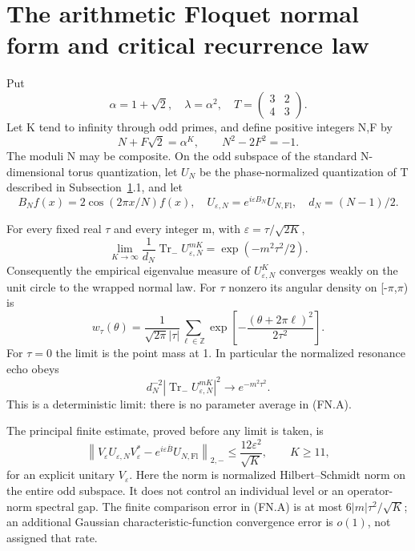 
\section{The arithmetic Floquet normal form and critical recurrence law}\label{sec:floquet}
Put \[
 \alpha=1+\sqrt2,\quad \lambda=\alpha^2,\quad
 T=\begin{pmatrix}3&2\\4&3\end{pmatrix}.
\] Let K tend to infinity through odd primes, and define positive integers N,F by \[
 N+F\sqrt2=\alpha^K,\qquad N^2-2F^2=-1.
\] The moduli N may be composite. On the odd subspace of the standard N-dimensional torus quantization, let \(U_{N}\) be the phase-normalized quantization of T described in Subsection~\ref{sec:floquet}.1, and let \[
 B_N f(x)=2\cos(2\pi x/N)f(x),\quad
 U_{\varepsilon,N}=e^{i\varepsilon B_N}U_{N,\mathrm{Fl}},\quad
 d_N=(N-1)/2.
\]

\begin{theorem}\label{pass1:ch07_floquet_resonance-1} For every fixed real \(\tau\) and every integer m, with \(\varepsilon=\tau/\sqrt{2K}\), \[
 \lim_{K\longrightarrow\infty}
 \frac{1}{d_N}\operatorname{Tr}_{-}
       U_{\varepsilon,N}^{mK}
       =\exp(-m^2\tau^2/2).                                      \tag{FN.A}
\] Consequently the empirical eigenvalue measure of \(U_{\varepsilon,N}^K\) converges weakly on the unit circle to the wrapped normal law. For \(\tau\) nonzero its angular density on {[}-\(\pi\),\(\pi\)) is \[
 w_\tau(\theta)=\frac{1}{\sqrt{2\pi}|\tau|}
       \sum_{\ell\in\mathbb Z}
       \exp\!\left[-\frac{(\theta+2\pi\ell)^2}{2\tau^2}\right].   \tag{FN.B}
\] For \(\tau=0\) the limit is the point mass at 1. In particular the normalized resonance echo obeys \[
 d_N^{-2}\left|\operatorname{Tr}_{-}U_{\varepsilon,N}^{mK}\right|^2
       \longrightarrow e^{-m^2\tau^2}.                          \tag{FN.C}
\] This is a deterministic limit: there is no parameter average in (FN.A).
\end{theorem}

The principal finite estimate, proved before any limit is taken, is \[
 \left\|V_\varepsilon U_{\varepsilon,N}V_\varepsilon^*
            -e^{i\varepsilon\overline B}U_{N,\mathrm{Fl}}\right\|_{2,-}
       \leq \frac{12\varepsilon^2}{\sqrt K},\qquad K\geq11,        \tag{FN.D}
\] for an explicit unitary \(V_{\varepsilon}\). Here the norm is normalized Hilbert--Schmidt norm on the entire odd subspace. It does not control an individual level or an operator-norm spectral gap. The finite comparison error in (FN.A) is at most \(6|m|\tau^2/\sqrt K\); an additional Gaussian characteristic-function convergence error is \(o(1)\), not assigned that rate.

